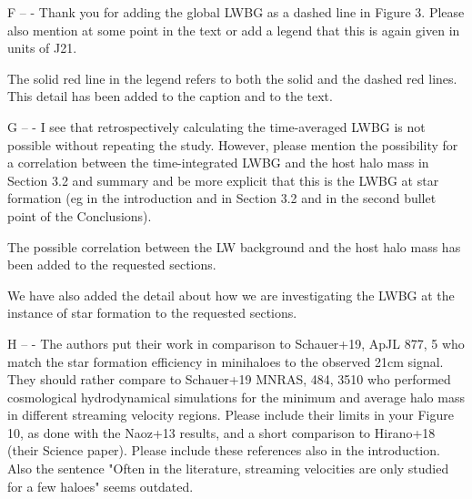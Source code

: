 \documentclass[11pt]{article}
\newenvironment{referee}[1][]{%
    \ignorespaces%
    \begin{mdframed}[style=myquotestyle,#1]%
}{%
    \end{mdframed}%
    \ignorespacesafterend%
}%
\begin{document}
\begin{referee}
    F -- - Thank you for adding the global LWBG as a dashed line in Figure 3. Please also mention at some point in the text or add a legend that this is again given in units of J21. 
\end{referee}
    The solid red line in the legend refers to both the solid and the dashed red lines. This detail has been added to the caption and to the text. 

\begin{referee}
    G -- - I see that retrospectively calculating the time-averaged LWBG is not possible without repeating the study. However, please mention the possibility for a correlation between the time-integrated LWBG and the host halo mass in Section 3.2 and summary and be more explicit that this is the LWBG at star formation (eg in the introduction and in Section 3.2 and in the second bullet point of the Conclusions).  
\end{referee}
    The possible correlation between the LW background and the host halo mass has been added to the requested sections.

    We have also added the detail about how we are investigating the LWBG at the instance of star formation to the requested sections.

\begin{referee}
    H -- - The authors put their work in comparison to Schauer+19, ApJL 877, 5 who match the star formation efficiency in minihaloes to the observed 21cm signal. They should rather compare to Schauer+19 MNRAS, 484, 3510 who performed cosmological hydrodynamical simulations for the minimum and average halo mass in different streaming velocity regions. Please include their limits in your Figure 10, as done with the Naoz+13 results, and a short comparison to Hirano+18 (their Science paper). Please include these references also in the introduction. Also the sentence "Often in the literature, streaming velocities are only studied for a few haloes" seems outdated.
\end{referee}
    
\end{document}
